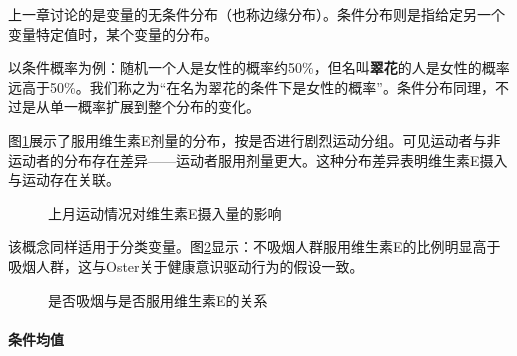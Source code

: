 上一章讨论的是变量的无条件分布（也称边缘分布）。条件分布则是指给定另一个变量特定值时，某个变量的分布。

以条件概率为例：随机一个人是女性的概率约50\%，但名叫\textbf{翠花}的人是女性的概率远高于50\%。我们称之为``在名为翠花的条件下是女性的概率''。条件分布同理，不过是从单一概率扩展到整个分布的变化。

图\ref{fig:vitaminE}展示了服用维生素E剂量的分布，按是否进行剧烈运动分组。可见运动者与非运动者的分布存在差异——运动者服用剂量更大。这种分布差异表明维生素E摄入与运动存在关联。

\begin{figure}[ht]
	\centering
	\caption{上月运动情况对维生素E摄入量的影响}
	\label{fig:vitaminE}
\end{figure}

该概念同样适用于分类变量。图\ref{fig:vitaminEbarchart}显示：不吸烟人群服用维生素E的比例明显高于吸烟人群，这与Oster关于健康意识驱动行为的假设一致。

\begin{figure}[ht]
	\centering
	\caption{是否吸烟与是否服用维生素E的关系}
	\label{fig:vitaminEbarchart}
\end{figure}

\paragraph*{条件均值}

